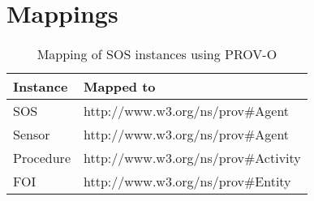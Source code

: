 \chapter{Mappings}
\label{mappings}

\begin{table}[!htbp]
	\centering
	\caption{Mapping of SOS instances using PROV-O}
	\label{map:SOS}
	\begin{tabular}{l|l}
		Instance		      		  	& Mapped to                           \\ \hline
		SOS  						  	& http://www.w3.org/ns/prov\#Agent     \\
		Sensor                         	& http://www.w3.org/ns/prov\#Agent     \\
		Procedure                       & http://www.w3.org/ns/prov\#Activity  \\
		FOI                           	& http://www.w3.org/ns/prov\#Entity                                                                 
	\end{tabular}
\end{table}

\begin{sidewaystable}[!htbp]
	\centering
	\caption{GetFeatureOfInterest mapping using om-lite and sam-lite}
	\label{map:getFOI}
\end{sidewaystable}

